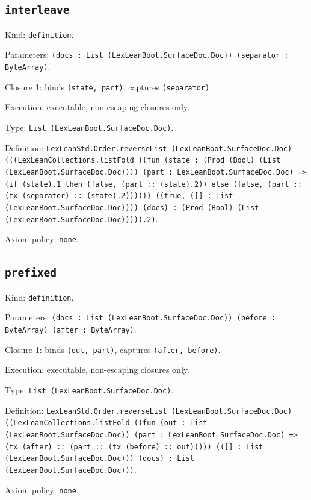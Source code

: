 \documentclass[11pt]{article}
\begin{document}
\subsection*{\texttt{interleave}}
\noindent Kind: \texttt{definition}.\par
\noindent Parameters: \texttt{(docs : List (LexLeanBoot.SurfaceDoc.Doc)) (separator : ByteArray)}.\par
\noindent Closure 1: binds \texttt{(state, part)}, captures \texttt{(separator)}.\par
\noindent Execution: executable, non-escaping closures only.\par
\noindent Type: \texttt{List (LexLeanBoot.SurfaceDoc.Doc)}.\par
\noindent Definition: \texttt{LexLeanStd.Order.reverseList (LexLeanBoot.SurfaceDoc.Doc) (((LexLeanCollections.listFold ((fun (state : (Prod (Bool) (List (LexLeanBoot.SurfaceDoc.Doc)))) (part : LexLeanBoot.SurfaceDoc.Doc) => (if (state).1 then (false, (part :: (state).2)) else (false, (part :: (tx (separator) :: (state).2)))))) ((true, ([] : List (LexLeanBoot.SurfaceDoc.Doc)))) (docs) : (Prod (Bool) (List (LexLeanBoot.SurfaceDoc.Doc))))).2)}.\par
\noindent Axiom policy: \texttt{none}.\par
\subsection*{\texttt{prefixed}}
\noindent Kind: \texttt{definition}.\par
\noindent Parameters: \texttt{(docs : List (LexLeanBoot.SurfaceDoc.Doc)) (before : ByteArray) (after : ByteArray)}.\par
\noindent Closure 1: binds \texttt{(out, part)}, captures \texttt{(after, before)}.\par
\noindent Execution: executable, non-escaping closures only.\par
\noindent Type: \texttt{List (LexLeanBoot.SurfaceDoc.Doc)}.\par
\noindent Definition: \texttt{LexLeanStd.Order.reverseList (LexLeanBoot.SurfaceDoc.Doc) ((LexLeanCollections.listFold ((fun (out : List (LexLeanBoot.SurfaceDoc.Doc)) (part : LexLeanBoot.SurfaceDoc.Doc) => (tx (after) :: (part :: (tx (before) :: out))))) (([] : List (LexLeanBoot.SurfaceDoc.Doc))) (docs) : List (LexLeanBoot.SurfaceDoc.Doc)))}.\par
\noindent Axiom policy: \texttt{none}.\par
\end{document}
